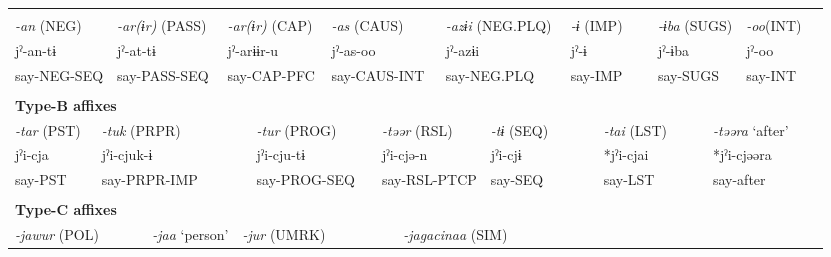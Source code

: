 \tabletail{}
\tablelasttail{}
\begin{tabularx}{\textwidth}{XXm{}XXXXXXXXXXXXXXXXXXXX}
\lsptoprule
\multicolumn{23}{X}{{\bfseries Type-A affixes}}\\
\multicolumn{3}{X}{{ \textit{{}-an} (NEG)}} & \multicolumn{3}{X}{{ \textit{{}-ar(ɨr)} (PASS)}} & \multicolumn{4}{X}{{ \textit{{}-ar(ɨr)} (CAP)}} & \multicolumn{4}{X}{{ \textit{{}-as} (CAUS)}} & \multicolumn{3}{X}{{ \textit{{}-azɨi} (NEG.PLQ)}} & \multicolumn{2}{X}{{ \textit{{}-ɨ} (IMP)}} & \multicolumn{2}{X}{{ \textit{{}-ɨba} (SUGS)}} & { \textit{{}-oo}(INT)} & \\
\multicolumn{3}{X}{{ jˀ-an-tɨ}} & \multicolumn{3}{X}{{ jˀ-at-tɨ}} & \multicolumn{4}{X}{{ jˀ-arɨɨr-u}} & \multicolumn{4}{X}{{ jˀ-as-oo}} & \multicolumn{3}{X}{{ jˀ-azɨi}} & \multicolumn{2}{X}{{ jˀ-ɨ}} & \multicolumn{2}{X}{{ jˀ-ɨba}} & { jˀ-oo} & \\
\multicolumn{3}{X}{say-NEG-SEQ} & \multicolumn{3}{X}{say-PASS-SEQ} & \multicolumn{4}{X}{say-CAP-PFC} & \multicolumn{4}{X}{say-CAUS-INT} & \multicolumn{3}{X}{say-NEG.PLQ} & \multicolumn{2}{X}{say-IMP} & \multicolumn{2}{X}{say-SUGS} & say-INT & \\
\multicolumn{23}{X}{}\\
\multicolumn{23}{X}{{\bfseries Type-B affixes}}\\
\multicolumn{2}{X}{{ \textit{{}-tar} (PST)}} & \multicolumn{6}{X}{{ \textit{{}-tuk} (PRPR)}} & \multicolumn{3}{X}{{ \textit{{}-tur} (PROG)}} & \multicolumn{4}{X}{{ \textit{{}-təər} (RSL)}} & \multicolumn{3}{X}{{ \textit{{}-tɨ} (SEQ)}} & \multicolumn{2}{X}{{ \textit{{}-tai} (LST)}} & \multicolumn{3}{X}{{ \textit{{}-təəra} ‘after’}}\\
\multicolumn{2}{X}{{ jˀi-cja}} & \multicolumn{6}{X}{{ jˀi-cjuk-ɨ}} & \multicolumn{3}{X}{{ jˀi-cju-tɨ}} & \multicolumn{4}{X}{{ jˀi-cjə-n}} & \multicolumn{3}{X}{{ jˀi-cjɨ}} & \multicolumn{2}{X}{{ *jˀi-cjai}} & \multicolumn{3}{X}{{ *jˀi-cjəəra}}\\
\multicolumn{2}{X}{say-PST} & \multicolumn{6}{X}{say-PRPR-IMP} & \multicolumn{3}{X}{say-PROG-SEQ} & \multicolumn{4}{X}{say-RSL-PTCP} & \multicolumn{3}{X}{say-SEQ} & \multicolumn{2}{X}{say-LST} & \multicolumn{3}{X}{{ say-after}}\\
\multicolumn{2}{X}{} & \multicolumn{6}{X}{} & \multicolumn{3}{X}{} & \multicolumn{4}{X}{} & \multicolumn{3}{X}{} & \multicolumn{2}{X}{} & \multicolumn{3}{X}{}\\
\multicolumn{23}{X}{{\bfseries Type-C affixes}}\\
\multicolumn{4}{X}{{ \textit{{}-jawur} (POL)}} & \multicolumn{3}{X}{{ \textit{{}-jaa} ‘person’}} & \multicolumn{5}{X}{{ \textit{{}-jur} (UMRK)}} & \multicolumn{4}{X}{{ \textit{{}-jagacinaa} (SIM)}} & \multicolumn{7}{X}{}\\

\end{tabularx}
